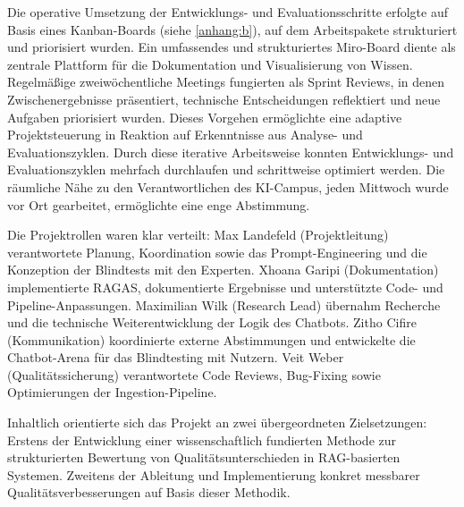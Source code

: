 Die operative Umsetzung der Entwicklungs- und Evaluationsschritte erfolgte auf Basis eines Kanban-Boards (siehe \autoref{anhang:b}), auf dem Arbeitspakete strukturiert und priorisiert wurden. Ein umfassendes und strukturiertes Miro-Board diente als zentrale Plattform für die Dokumentation und Visualisierung von Wissen. Regelmäßige zweiwöchentliche Meetings fungierten als Sprint Reviews, in denen Zwischenergebnisse präsentiert, technische Entscheidungen reflektiert und neue Aufgaben priorisiert wurden. Dieses Vorgehen ermöglichte eine adaptive Projektsteuerung in Reaktion auf Erkenntnisse aus Analyse- und Evaluationszyklen. Durch diese iterative Arbeitsweise konnten Entwicklungs- und Evaluationszyklen mehrfach durchlaufen und schrittweise optimiert werden. Die räumliche Nähe zu den Verantwortlichen des KI-Campus, jeden Mittwoch wurde vor Ort gearbeitet, ermöglichte eine enge Abstimmung.

Die Projektrollen waren klar verteilt: Max Landefeld (Projektleitung) verantwortete Planung, Koordination sowie das Prompt-Engineering und die Konzeption der Blindtests mit den Experten. Xhoana Garipi (Dokumentation) implementierte RAGAS, dokumentierte Ergebnisse und unterstützte Code- und Pipeline-Anpassungen. Maximilian Wilk (Research Lead) übernahm Recherche und die technische Weiterentwicklung der Logik des Chatbots. Zitho Cifire (Kommunikation) koordinierte externe Abstimmungen und entwickelte die Chatbot-Arena für das Blindtesting mit Nutzern. Veit Weber (Qualitätssicherung) verantwortete Code Reviews, Bug-Fixing sowie Optimierungen der Ingestion-Pipeline.

Inhaltlich orientierte sich das Projekt an zwei übergeordneten Zielsetzungen: Erstens der Entwicklung einer wissenschaftlich fundierten Methode zur strukturierten Bewertung von Qualitätsunterschieden in RAG-basierten Systemen. Zweitens der Ableitung und Implementierung konkret messbarer Qualitätsverbesserungen auf Basis dieser Methodik.
